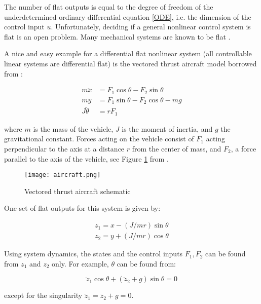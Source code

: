 The number of flat outputs is equal to the degree of freedom of the underdetermined ordinary differential equation \eqref{ODE}, i.e. the dimension of the control input $u$.
Unfortunately, deciding if a general nonlinear control system is flat is an open problem. Many mechanical systems are known to be flat \cite{Murray97nonlinearcontrol}.

A nice and easy example for a differential flat nonlinear system (all controllable linear systems are differential flat) is the vectored thrust aircraft model borrowed from \cite{Murray97nonlinearcontrol}:

\begin{equation}
\begin{aligned}
m \ddot{x}      & = F_{1}\cos{\theta} - F_{2}\sin{\theta} \\
m \ddot{y}      & = F_{1}\sin{\theta} - F_{2}\cos{\theta} - mg \\
J \ddot{\theta} & = r F_{1} 
\end{aligned}
\label{aircraftDynamics}
\end{equation}

where $m$ is the mass of the vehicle, $J$ is the moment of inertia, and $g$ the gravitational constant. Forces acting on the vehicle consist of $F_{1}$ acting perpendicular to the axis at a distance $r$ from the center of mass, and $F_{2}$, a force parallel to the axis of the vehicle, see Figure \ref{Aircraft} from \cite{AM08}.

\begin{figure}
\center
\texttt{[image: aircraft.png]}
\caption{Vectored thrust aircraft schematic}
\label{Aircraft}
\end{figure}

One set of flat outputs for this system is given by:

\begin{eqnarray}
z_{1} = x - (J/mr)\sin{\theta} \\
z_{2} = y + (J/mr)\cos{\theta} 
\end{eqnarray} 

Using system dynamics, the states and the control inputs $F_{1}, F_{2}$ can be found from $z_{1}$ and $z_{2}$ only. For example, $\theta$ can be found from:

\begin{equation}
\ddot{z}_{1} \cos{\theta} + (\ddot{z}_{2} + g) \sin{\theta} = 0
\end{equation}

except for the singularity $\ddot{z}_{1} = \ddot{z}_{2} + g = 0$.

